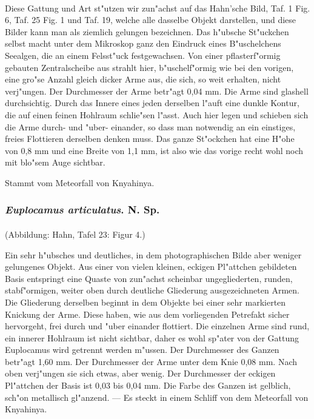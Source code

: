 \documentclass[a4paper, 11pt, oneside]{article}
\begin{document}
\paragraph{}
Diese Gattung und Art st"utzen wir zun"achst auf das Hahn'sche Bild, Taf. 1 Fig. 6, Taf. 25 Fig. 1 und Taf. 19, welche alle dasselbe Objekt darstellen, und diese Bilder kann man als ziemlich gelungen bezeichnen. Das h"ubsche St"uckchen selbst macht unter dem Mikroskop ganz den Eindruck eines B"uschelchens Seealgen, die an einem Felsst"uck festgewachsen. Von einer pflasterf"ormig gebauten Zentralscheibe aus strahlt hier, b"uschelf"ormig wie bei den vorigen, eine gro"se Anzahl gleich dicker Arme aus, die sich, so weit erhalten, nicht verj"ungen. Der Durchmesser der Arme betr"agt 0,04 mm. Die Arme sind glashell durchsichtig. Durch das Innere eines jeden derselben l"auft eine dunkle Kontur, die auf einen feinen Hohlraum schlie"sen l"asst. Auch hier legen und schieben sich die Arme durch- und "uber- einander, so dass man notwendig an ein einstiges, freies Flottieren derselben denken muss. Das ganze St"ockchen hat eine H"ohe von 0,8 mm und eine Breite von 1,1 mm, ist also wie das vorige recht wohl noch mit blo"sem Auge sichtbar.

Stammt vom Meteorfall von Knyahinya.
\subsubsection{\emph{Euplocamus articulatus}. N. Sp.}
\paragraph{}
(Abbildung: Hahn, Tafel 23: Figur 4.)

Ein sehr h"ubsches und deutliches, in dem photographischen Bilde aber weniger gelungenes Objekt. Aus einer von vielen kleinen, eckigen Pl"attchen gebildeten Basis entspringt eine Quaste von zun"achst scheinbar ungegliederten, runden, stabf"ormigen, weiter oben durch deutliche Gliederung ausgezeichneten Armen. Die Gliederung derselben beginnt in dem Objekte bei einer sehr markierten Knickung der Arme. Diese haben, wie aus dem vorliegenden Petrefakt sicher hervorgeht, frei durch und "uber einander flottiert. Die einzelnen Arme sind rund, ein innerer Hohlraum ist nicht sichtbar, daher es wohl sp"ater von der Gattung Euplocamus wird getrennt werden m"ussen. Der Durchmesser des Ganzen betr"agt 1,60 mm. Der Durchmesser der Arme unter dem Knie 0,08 mm. Nach oben verj"ungen sie sich etwas, aber wenig. Der Durchmesser der eckigen Pl"attchen der Basis ist 0,03 bis 0,04 mm. Die Farbe des Ganzen ist gelblich, sch"on metallisch gl"anzend. --- Es steckt in einem Schliff von dem Meteorfall von Knyahinya.
\end{document}
